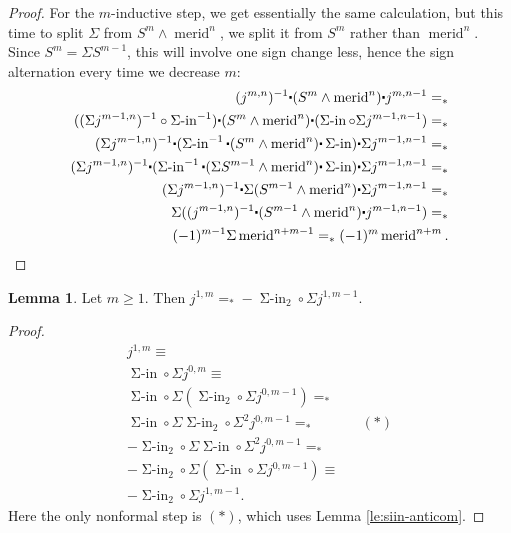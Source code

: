 \documentclass{amsart}
\theoremstyle{definition}
\newtheorem{lem}[theorem]{Lemma}
\newcommand{\merid}{\operatorname{merid}}
\newcommand{\siin}{\operatorname{\Sigma-in}}
\newcommand{\whisk}{\raisebox{0.5ex}{$\displaystyle\centerdot$}}
\begin{document}
\begin{proof}
    For the $m$-inductive step, we get essentially the same calculation, but this time to split $\Sigma$ from $S^m \wedge \merid^n$, we split it from $S^m$ rather than $\merid^n$. Since $S^m = \Sigma S^{m-1}$, this will involve one sign change less, hence the sign alternation every time we decrease $m$:
    \begin{align*}
    ({j^{m,n}})^{-1} \whisk (S^m \wedge \merid^n) \whisk j^{m,n-1} =_* \\
    ((\Sigma {j^{m-1,n}})^{-1} \circ \siin^{-1}) \whisk (S^m \wedge \merid^n) \whisk (\siin \circ \Sigma j^{m-1,n-1}) =_* \\
    (\Sigma {j^{m-1,n}})^{-1} \whisk (\siin^{-1} \whisk (S^m \wedge \merid^n) \whisk \siin) \whisk \Sigma j^{m-1,n-1} =_* \\
    (\Sigma {j^{m-1,n}})^{-1} \whisk (\siin^{-1} \whisk  (\Sigma S^{m-1} \wedge \merid^{n})  \whisk \siin) \whisk \Sigma j^{m-1,n-1} =_* \\
    (\Sigma {j^{m-1,n}})^{-1} \whisk \Sigma (S^{m-1} \wedge \merid^{n}) \whisk \Sigma j^{m-1,n-1} =_* \\
    \Sigma (({j^{m-1,n}})^{-1} \whisk (S^{m-1} \wedge \merid^{n}) \whisk j^{m-1,n-1}) =_* \\
    (-1)^{m-1} \Sigma \merid^{n+m-1} =_* (-1)^m\merid^{n+m}.
    \end{align*}
\end{proof}




\begin{lem}\label{le:j1-ind}
Let $m \geq 1$. Then $j^{1, m} =_* -\siin_2 \circ \Sigma j^{1, m-1}$.
\end{lem}
\begin{proof}
    \begin{align*}
        j^{1, m} \equiv \\
        \siin \circ \Sigma j^{0, m} \equiv \\
        \siin \circ \Sigma (\siin_2 \circ \Sigma j^{0, m-1}) =_* \\
        \siin \circ \Sigma \siin_2 \circ \Sigma^2 j^{0, m-1} =_* && (*) \\
        -\siin_2 \circ \Sigma \siin \circ \Sigma^2 j^{0, m-1} =_*  \\
        -\siin_2 \circ \Sigma (\siin \circ \Sigma j^{0, m-1}) \equiv \\
        -\siin_2 \circ \Sigma j^{1, m-1}.
    \end{align*}
    Here the only nonformal step is $(*)$, which uses Lemma \ref{le:siin-anticom}.
\end{proof}
\end{document}
